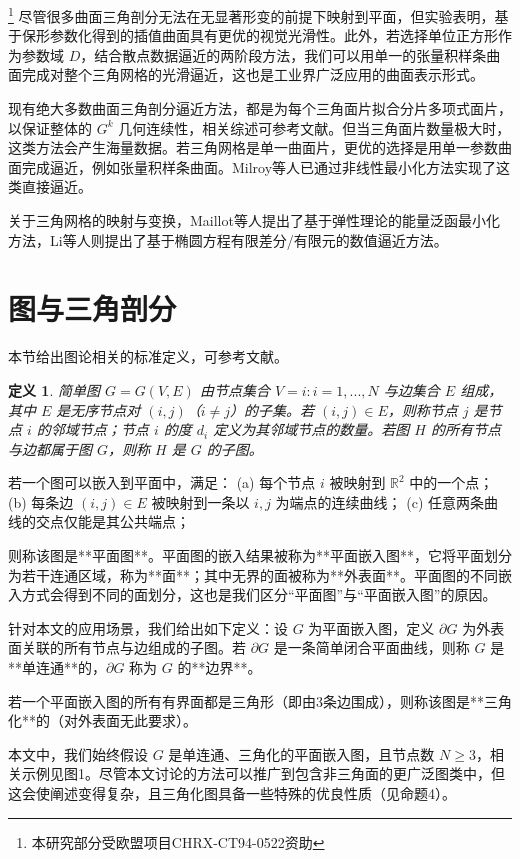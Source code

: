 \documentclass{ctexart}
\newtheorem{definition}{定义}
\theoremstyle{proof}
\begin{document}
\footnote{本研究部分受欧盟项目CHRX-CT94-0522资助}
尽管很多曲面三角剖分无法在无显著形变的前提下映射到平面，但实验表明，基于保形参数化得到的插值曲面具有更优的视觉光滑性。此外，若选择单位正方形作为参数域 $D$，结合散点数据逼近的两阶段方法\cite{franke1986}，我们可以用单一的张量积样条曲面完成对整个三角网格的光滑逼近，这也是工业界广泛应用的曲面表示形式。

现有绝大多数曲面三角剖分逼近方法，都是为每个三角面片拟合分片多项式面片，以保证整体的 $G^k$ 几何连续性，相关综述可参考文献\cite{lounsberry1992}。但当三角面片数量极大时，这类方法会产生海量数据。若三角网格是单一曲面片，更优的选择是用单一参数曲面完成逼近，例如张量积样条曲面。Milroy等人\cite{milroy1995}已通过非线性最小化方法实现了这类直接逼近。

关于三角网格的映射与变换，Maillot等人\cite{maillot1993}提出了基于弹性理论的能量泛函最小化方法，Li等人\cite{li1992}则提出了基于椭圆方程有限差分/有限元的数值逼近方法。

\section{图与三角剖分}
本节给出图论相关的标准定义，可参考文献\cite{marshall1971}。

\begin{definition}
简单图 $G=G(V, E)$ 由节点集合 $V={i: i=1, ..., N}$ 与边集合 $E$ 组成，其中 $E$ 是无序节点对 $(i, j)$（$i≠j$）的子集。若 $(i, j) \in E$，则称节点 $j$ 是节点 $i$ 的邻域节点；节点 $i$ 的度 $d_i$ 定义为其邻域节点的数量。若图 $H$ 的所有节点与边都属于图 $G$，则称 $H$ 是 $G$ 的子图。
\end{definition}

若一个图可以嵌入到平面中，满足：
(a) 每个节点 $i$ 被映射到 $\mathbb{R}^2$ 中的一个点；
(b) 每条边 $(i, j) \in E$ 被映射到一条以 $i,j$ 为端点的连续曲线；
(c) 任意两条曲线的交点仅能是其公共端点；

则称该图是**平面图**。平面图的嵌入结果被称为**平面嵌入图**，它将平面划分为若干连通区域，称为**面**；其中无界的面被称为**外表面**。平面图的不同嵌入方式会得到不同的面划分，这也是我们区分“平面图”与“平面嵌入图”的原因。

针对本文的应用场景，我们给出如下定义：设 $G$ 为平面嵌入图，定义 $\partial G$ 为外表面关联的所有节点与边组成的子图。若 $\partial G$ 是一条简单闭合平面曲线，则称 $G$ 是**单连通**的，$\partial G$ 称为 $G$ 的**边界**。

若一个平面嵌入图的所有有界面都是三角形（即由3条边围成），则称该图是**三角化**的（对外表面无此要求）。

本文中，我们始终假设 $G$ 是单连通、三角化的平面嵌入图，且节点数 $N ≥3$，相关示例见图1。尽管本文讨论的方法可以推广到包含非三角面的更广泛图类中，但这会使阐述变得复杂，且三角化图具备一些特殊的优良性质（见命题4）。
\end{document}
